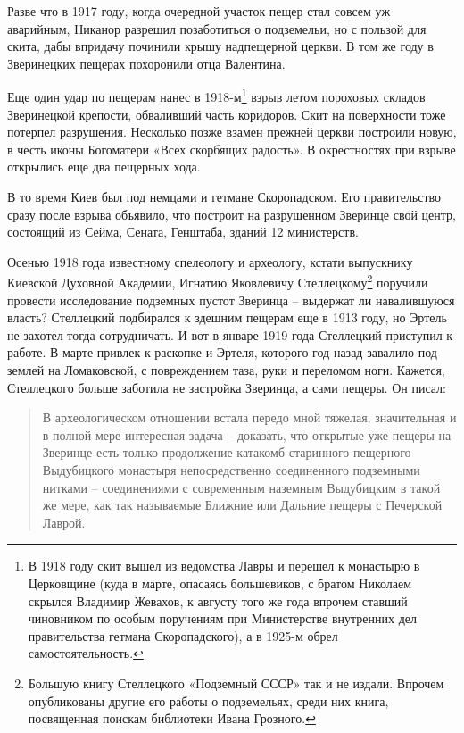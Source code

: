 Разве что в 1917 году, когда очередной участок пещер стал совсем уж аварийным, Никанор разрешил позаботиться о подземельи, но с пользой для скита, дабы впридачу починили крышу надпещерной церкви. В том же году в Зверинецких пещерах похоронили отца Валентина.

Еще один удар по пещерам нанес в 1918-м\footnote{В 1918 году скит вышел из ведомства Лавры и перешел к монастырю в Церковщине (куда в марте, опасаясь большевиков, с братом Николаем скрылся Владимир Жевахов, к августу того же года впрочем ставший чиновником по особым поручениям при Министерстве внутренних дел правительства гетмана Скоропадского), а в 1925-м обрел самостоятельность.} взрыв летом пороховых складов Зверинецкой крепости, обваливший часть коридоров. Скит на поверхности тоже потерпел разрушения. Несколько позже взамен прежней церкви построили новую, в честь иконы Богоматери «Всех скорбящих радость». В окрестностях при взрыве открылись еще два пещерных хода.

В то время Киев был под немцами и гетмане Скоропадском. Его правительство сразу после взрыва объявило, что построит на разрушенном Зверинце свой центр, состоящий из Сейма, Сената, Генштаба, зданий 12 министерств.

Осенью 1918 года известному спелеологу и археологу, кстати выпускнику Киевской Духовной Академии, Игнатию Яковлевичу Стеллецкому\footnote{Большую книгу Стеллецкого «Подземный СССР» так и не издали. Впрочем опубликованы другие его работы о подземельях, среди них книга, посвященная поискам библиотеки Ивана Грозного.} поручили провести исследование подземных пустот Зверинца – выдержат ли навалившуюся власть? Стеллецкий подбирался к здешним пещерам еще в 1913 году, но Эртель не захотел тогда сотрудничать. И вот в январе 1919 года Стеллецкий приступил к работе. В марте привлек к раскопке и Эртеля, которого год назад завалило под землей на Ломаковской, с повреждением таза, руки и переломом ноги. Кажется, Стеллецкого больше заботила не застройка Зверинца, а сами пещеры. Он писал:

\begin{quotation}
В археологическом отношении встала передо мной тяжелая, значительная и в полной мере интересная задача – доказать, что открытые уже пещеры на Зверинце есть только продолжение катакомб старинного пещерного Выдубицкого монастыря непосредственно соединенного подземными нитками – соединениями с современным наземным Выдубицким в такой же мере, как так называемые Ближние или Дальние пещеры с Печерской Лаврой.
\end{quotation}

